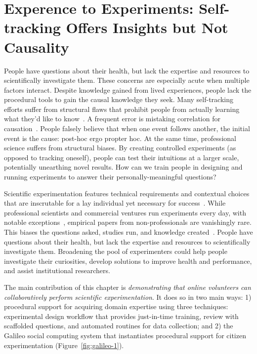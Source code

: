 \section{Experence to Experiments: Self-tracking Offers Insights but Not Causality}
People have questions about their health, but lack the expertise and resources to scientifically
investigate them. These concerns are especially acute when multiple factors interact. Despite
knowledge gained from lived experiences, people lack the procedural tools to gain the causal
knowledge they seek. Many self-tracking efforts suffer from structural flaws that prohibit people
from actually learning what they'd like to know~\cite{Choe2014, Li2010a}. A frequent error is mistaking correlation
for causation~\cite{Munroe2009}. People falsely believe that when one event follows another, the initial event is
the cause: post-hoc ergo propter hoc. At the same time, professional science suffers from structural
biases. By creating controlled experiments (as opposed to tracking oneself), people can test their
intuitions at a larger scale, potentially unearthing novel results. How can we train people in designing
and running experiments to answer their personally-meaningful questions?

Scientific experimentation features technical requirements and contextual choices that are inscrutable for a lay individual yet necessary for success~\cite{Martin2007}. While professional scientists and commercial ventures run experiments every day, with notable exceptions~\cite{Cooper2010, Lewis2016}, empirical papers from non-professionals are vanishingly rare. This biases the questions asked, studies run, and knowledge created~\cite{crawford2017politics,Henrich2010a}. People have questions about their health, but lack the expertise and resources to scientifically investigate them. Broadening the pool of experimenters could help people investigate their curiosities, develop solutions to improve health and performance, and assist institutional researchers.

The main contribution of this chapter is \textit {demonstrating that online volunteers can collaboratively perform scientific experimentation}. It does so in two main ways: 1) procedural support for acquiring domain expertise using three techniques: experimental design workflow that provides just-in-time training, review with scaffolded questions, and automated routines for data collection; and 2) the Galileo social computing system that instantiates procedural support for citizen experimentation (Figure~\ref{fig:galileo-1}). 

